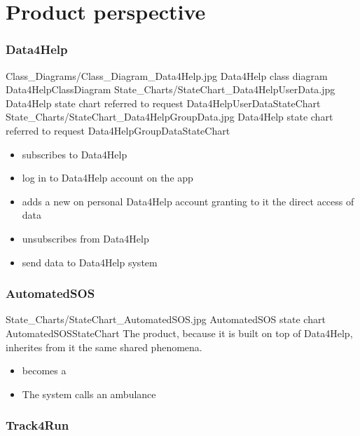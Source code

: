 \documentclass[../../rasd.tex]{subfiles}
\begin{document}
	
	\section{Product perspective}

		\subsubsection{Data4Help}

			\image {13cm} {Class_Diagrams/Class_Diagram_Data4Help.jpg} {Data4Help class diagram} {Data4HelpClassDiagram}
			\image {13cm} {State_Charts/StateChart_Data4HelpUserData.jpg} {Data4Help state chart referred to  request} {Data4HelpUserDataStateChart}
			\image {13cm} {State_Charts/StateChart_Data4HelpGroupData.jpg} {Data4Help state chart referred to  request} {Data4HelpGroupDataStateChart}

			\begin{itemize}
				\item {} subscribes to Data4Help
				\item {} log in to Data4Help account on the app
				\item {} adds a new  on personal Data4Help account granting to it the direct access of data
				\item {} unsubscribes from Data4Help
				\item {} send data to Data4Help system
			\end{itemize}

		\subsubsection{AutomatedSOS}

			\image {13cm} {State_Charts/StateChart_AutomatedSOS.jpg} {AutomatedSOS state chart} {AutomatedSOSStateChart}
			The product, because it is built on top of Data4Help, inherites from it the same shared phenomena.

			\begin{itemize}
				\item {} becomes a 
				\item The system calls an ambulance
			\end{itemize}

		\subsubsection{Track4Run}
\end{document}
